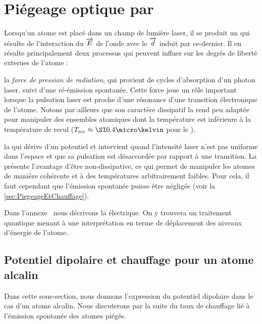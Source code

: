 \section{Piégeage optique par \fds}

Lorsqu'un atome est placé dans un champ de lumière laser, il se produit un  qui résulte de l'interaction du \che ${\overrightarrow{E}}$ de l'onde avec le \da ${\overrightarrow{d}}$ induit par ce-dernier. Il en résulte principalement deux processus qui peuvent influer sur les degrés de liberté externes de l'atome :
\begin{itemizel}
	\item la \emph{force de pression de radiation}, qui provient de cycles d'absorption d'un photon laser, suivi d'une ré-émission spontanée. Cette force joue un rôle important lorsque la pulsation laser est proche d'une résonance d'une transition électronique de l'atome. Notons par ailleurs que son caractère dissipatif la rend peu adaptée pour manipuler des ensembles atomiques dont la température est inférieure à la température de recul ($\Trecul\approx\microK{0.4}$ pour le \Rb).
	\item la \termetech{\fd} qui dérive d'un potentiel et intervient quand l'intensité laser n'est pas uniforme dans l'espace et que sa pulsation est désaccordée par rapport à une transition. La \fd présente l'avantage d'être non-dissipative, ce qui permet de manipuler les atomes de manière cohérente et à des températures arbitrairement faibles.
Pour cela, il faut cependant que l'émission spontanée puisse être négligée (voir la \autoref{sec:PiegeageEtChauffage}). 
\end{itemizel}

Dans l'annexe~ nous décrivons la \fd électrique. On y trouvera 
un traitement quantique menant à une interprétation en terme de déplacement des niveaux d'énergie de l'atome. 

\subsection{Potentiel dipolaire et chauffage pour un atome alcalin}\label{sec:PiegeageEtChauffage}

Dans cette sous-section, nous donnons l'expression du potentiel dipolaire dans le cas d'un atome alcalin. Nous discuterons par la suite du taux de chauffage lié à l'émission spontanée des atomes piégés.



